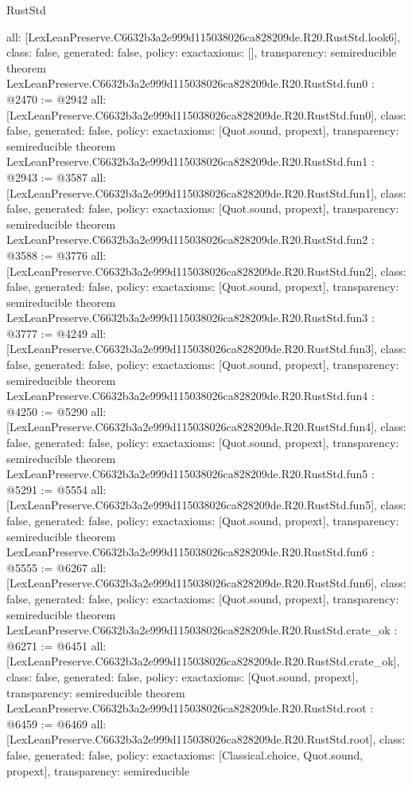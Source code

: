 \begin{lexlean}{RustStd}
\begin{coremodule}
{  all: [LexLeanPreserve.C6632b3a2e999d115038026ca828209de.R20.RustStd.look6],
  class: false,
  generated: false,
  policy: exact{axioms: []},
  transparency: semireducible
}
theorem LexLeanPreserve.C6632b3a2e999d115038026ca828209de.R20.RustStd.fun0 : @2470 := @2942 {
  all: [LexLeanPreserve.C6632b3a2e999d115038026ca828209de.R20.RustStd.fun0],
  class: false,
  generated: false,
  policy: exact{axioms: [Quot.sound, propext]},
  transparency: semireducible
}
theorem LexLeanPreserve.C6632b3a2e999d115038026ca828209de.R20.RustStd.fun1 : @2943 := @3587 {
  all: [LexLeanPreserve.C6632b3a2e999d115038026ca828209de.R20.RustStd.fun1],
  class: false,
  generated: false,
  policy: exact{axioms: [Quot.sound, propext]},
  transparency: semireducible
}
theorem LexLeanPreserve.C6632b3a2e999d115038026ca828209de.R20.RustStd.fun2 : @3588 := @3776 {
  all: [LexLeanPreserve.C6632b3a2e999d115038026ca828209de.R20.RustStd.fun2],
  class: false,
  generated: false,
  policy: exact{axioms: [Quot.sound, propext]},
  transparency: semireducible
}
theorem LexLeanPreserve.C6632b3a2e999d115038026ca828209de.R20.RustStd.fun3 : @3777 := @4249 {
  all: [LexLeanPreserve.C6632b3a2e999d115038026ca828209de.R20.RustStd.fun3],
  class: false,
  generated: false,
  policy: exact{axioms: [Quot.sound, propext]},
  transparency: semireducible
}
theorem LexLeanPreserve.C6632b3a2e999d115038026ca828209de.R20.RustStd.fun4 : @4250 := @5290 {
  all: [LexLeanPreserve.C6632b3a2e999d115038026ca828209de.R20.RustStd.fun4],
  class: false,
  generated: false,
  policy: exact{axioms: [Quot.sound, propext]},
  transparency: semireducible
}
theorem LexLeanPreserve.C6632b3a2e999d115038026ca828209de.R20.RustStd.fun5 : @5291 := @5554 {
  all: [LexLeanPreserve.C6632b3a2e999d115038026ca828209de.R20.RustStd.fun5],
  class: false,
  generated: false,
  policy: exact{axioms: [Quot.sound, propext]},
  transparency: semireducible
}
theorem LexLeanPreserve.C6632b3a2e999d115038026ca828209de.R20.RustStd.fun6 : @5555 := @6267 {
  all: [LexLeanPreserve.C6632b3a2e999d115038026ca828209de.R20.RustStd.fun6],
  class: false,
  generated: false,
  policy: exact{axioms: [Quot.sound, propext]},
  transparency: semireducible
}
theorem LexLeanPreserve.C6632b3a2e999d115038026ca828209de.R20.RustStd.crate_ok : @6271 := @6451 {
  all: [LexLeanPreserve.C6632b3a2e999d115038026ca828209de.R20.RustStd.crate_ok],
  class: false,
  generated: false,
  policy: exact{axioms: [Quot.sound, propext]},
  transparency: semireducible
}
theorem LexLeanPreserve.C6632b3a2e999d115038026ca828209de.R20.RustStd.root : @6459 := @6469 {
  all: [LexLeanPreserve.C6632b3a2e999d115038026ca828209de.R20.RustStd.root],
  class: false,
  generated: false,
  policy: exact{axioms: [Classical.choice, Quot.sound, propext]},
  transparency: semireducible
}


\end{coremodule}
\end{lexlean}
